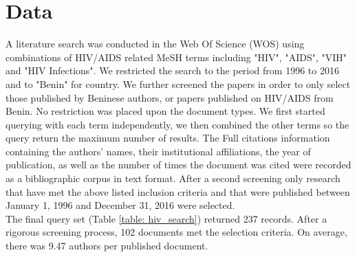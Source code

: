 
\section{Data}
\label{sec:hiv_data}
A literature search was conducted in the Web Of Science (WOS) using combinations of HIV/AIDS related MeSH terms including "HIV", "AIDS", "VIH" and "HIV Infections". We restricted the search to the period from 1996 to 2016 and to "Benin" for country. We further screened the papers in order to only select those published by Beninese authors, or papers published on HIV/AIDS from Benin. No restriction was placed upon the document types.  We first started querying with each term independently, we then combined the other terms so the query return the maximum number of results. The  Full citations information containing the authors' names, their institutional affiliations, the year of publication, as well as the number of times the document was cited were recorded as a bibliographic corpus in text format. After a second screening only research that have met the above listed inclusion criteria and that were published between January 1, 1996 and December 31, 2016 were selected.\\
The final query set (Table \ref{table: hiv_search}) returned 237 records. After a rigorous screening process, 102 documents met the selection criteria. On average, there was 9.47 authors per published document.


